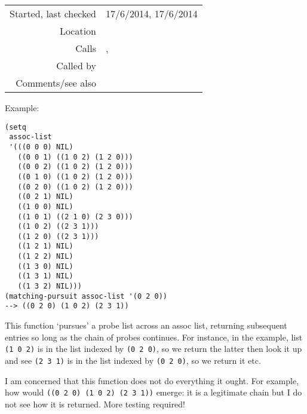 \vspace{0.3cm}
\begin{tabular}{r|p{8cm}}
Started, last checked & 17/6/2014, 17/6/2014 \\
Location & \nameref{sec:c@merata-processing} \\
Calls & \nameref{fun:bar-n-beat-number-of-ontime}, \nameref{fun:ontime-of-bar-n-beat-number} \\
Called by & \nameref{fun:cross-check-compound-questions} \\
Comments/see also &
\end{tabular}

\vspace{0.5cm}
\noindent Example:
\begin{verbatim}
(setq
 assoc-list
 '(((0 0 0) NIL)
   ((0 0 1) ((1 0 2) (1 2 0)))
   ((0 0 2) ((1 0 2) (1 2 0)))
   ((0 1 0) ((1 0 2) (1 2 0)))
   ((0 2 0) ((1 0 2) (1 2 0)))
   ((0 2 1) NIL)
   ((1 0 0) NIL)
   ((1 0 1) ((2 1 0) (2 3 0)))
   ((1 0 2) ((2 3 1)))
   ((1 2 0) ((2 3 1)))
   ((1 2 1) NIL)
   ((1 2 2) NIL)
   ((1 3 0) NIL)
   ((1 3 1) NIL)
   ((1 3 2) NIL)))
(matching-pursuit assoc-list '(0 2 0))
--> ((0 2 0) (1 0 2) (2 3 1))
\end{verbatim}

\noindent This function `pursues' a probe list across
an assoc list, returning subsequent entries so long
as the chain of probes continues. For instance, in the
example, list \texttt{(1 0 2)} is in the list indexed
by \texttt{(0 2 0)}, so we return the latter then look
it up and see \texttt{(2 3 1)} is in the list indexed
by \texttt{(0 2 0)}, so we return it etc.

I am concerned that this function does not do
everything it ought. For example, how would
\texttt{((0 2 0) (1 0 2) (2 3 1))} emerge: it is a
legitimate chain but I do not see how it is returned.
More testing required!